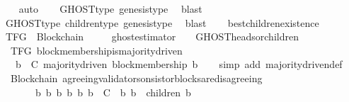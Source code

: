 \begin{isabellebody}
\ \ \isamarkupfalse%
\ auto\isanewline
\ \ \isamarkupfalse%
\ GHOST{\isacharunderscore}type\ genesis{\isacharunderscore}type{\isacharparenleft}{}{\isacharparenright}\ \isamarkupfalse%
\ blast\isanewline
\ \ \isamarkupfalse%
\ GHOST{\isacharunderscore}type\ children{\isacharunderscore}type\ genesis{\isacharunderscore}type{\isacharparenleft}{}{\isacharparenright}\ \isamarkupfalse%
\ blast\isanewline
\ \ \isamarkupfalse%
\ best{\isacharunderscore}children{\isacharunderscore}existence\ \ \isanewline
\ \ \isamarkupfalse%
%
\endisatagproof
{\isafoldproof}%
%
\isadelimproof
\isanewline
%
\endisadelimproof
\isanewline
\isanewline
\isanewline
{}\isamarkupfalse%
\ TFG\ {\isacharequal}\ Blockchain\ {\isacharplus}\ \isanewline
\ \ \ ghost{\isacharunderscore}estimator\ {\isacharcolon}\ {\isachardoublequoteopen}{\isasymepsilon}\ {\isacharequal}\ GHOST{\isacharunderscore}heads{\isacharunderscore}or{\isacharunderscore}children{\isachardoublequoteclose}\isanewline
\isanewline
{}\isamarkupfalse%
\ {\isacharparenleft}\ TFG{\isacharparenright}\ block{\isacharunderscore}membership{\isacharunderscore}is{\isacharunderscore}majority{\isacharunderscore}driven\ {\isacharcolon}\isanewline
\ \ {\isachardoublequoteopen}{\isasymforall}\ b\ {\isasymin}\ C{\isachardot}\ majority{\isacharunderscore}driven\ {\isacharparenleft}block{\isacharunderscore}membership\ b{\isacharparenright}{\isachardoublequoteclose}\isanewline
%
\isadelimproof
\ \ %
\endisadelimproof
%
\isatagproof
{}\isamarkupfalse%
\ {\isacharparenleft}simp\ add{\isacharcolon}\ majority{\isacharunderscore}driven{\isacharunderscore}def{\isacharparenright}\isanewline
\ \ \isamarkupfalse%
%
\endisatagproof
{\isafoldproof}%
%
\isadelimproof
\isanewline
%
\endisadelimproof
\isanewline
{}\isamarkupfalse%
\ {\isacharparenleft}\ Blockchain{\isacharparenright}\ agreeing{\isacharunderscore}validators{\isacharunderscore}on{\isacharunderscore}sistor{\isacharunderscore}blocks{\isacharunderscore}are{\isacharunderscore}disagreeing\ {\isacharcolon}\isanewline
\ \ {\isachardoublequoteopen}{\isasymforall}\ {\isasymsigma}\ {\isasymin}\ {\isasymSigma}{\isachardot}\ {\isasymforall}\ b\ b{}\ b{}{\isachardot}\ {\isacharbraceleft}b{\isacharcomma}\ b{}{\isacharcomma}\ b{}{\isacharbraceright}\ {\isasymsubseteq}\ C\ {\isasymand}\ {\isacharbraceleft}b{}{\isacharcomma}\ b{}{\isacharbraceright}\ {\isasymsubseteq}\ children\ {\isacharparenleft}b{\isacharcomma}\ {\isasymsigma}{\isacharparenright}\ \isanewline

\end{isabellebody}
